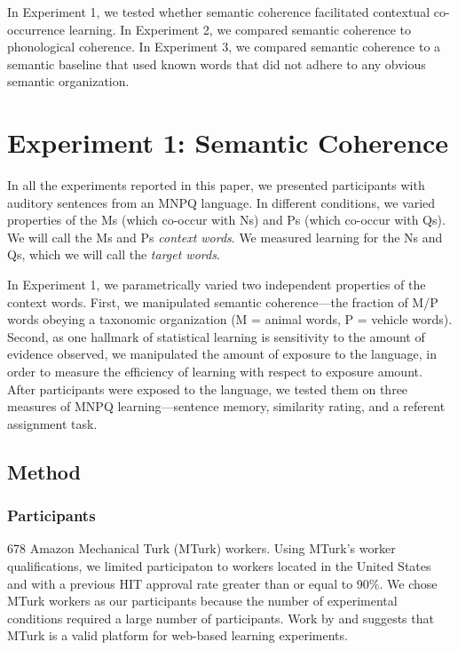 \documentclass[man,floatsintext]{apa6}
\begin{document}
In Experiment 1, we tested whether semantic coherence facilitated contextual co-occurrence learning. In Experiment 2, we compared semantic coherence to phonological coherence. In Experiment 3, we compared semantic coherence to a semantic baseline that used known words that did not adhere to any obvious semantic organization.

\section{Experiment 1: Semantic Coherence}

In all the experiments reported in this paper, we presented participants with auditory sentences from an MNPQ language. In different conditions, we varied properties of the Ms (which co-occur with Ns) and Ps (which co-occur with Qs). We will call the Ms and Ps \emph{context words}. We measured learning for the Ns and Qs, which we will call the \emph{target words}.

In Experiment 1, we parametrically varied two independent properties of the context words. First, we manipulated semantic coherence---the fraction of M/P words obeying a taxonomic organization (M = animal words, P = vehicle words). Second, as one hallmark of statistical learning is sensitivity to the amount of evidence observed, we manipulated the amount of exposure to the language, in order to measure the efficiency of learning with respect to exposure amount. After participants were exposed to the language, we tested them on three measures of MNPQ learning---sentence memory, similarity rating, and a referent assignment task.

\subsection{Method}

\subsubsection{Participants}
678 Amazon Mechanical Turk (MTurk) workers. Using MTurk's worker qualifications, we limited participaton to workers located in the United States and with a previous HIT approval rate greater than or equal to 90\%. We chose MTurk workers as our participants because the number of experimental conditions required a large number of participants. Work by \citet{buhrmester2010} and \citet{crump2013} suggests that MTurk is a valid platform for web-based learning experiments.
\end{document}
